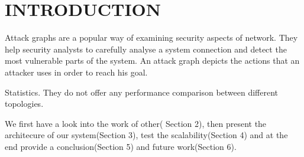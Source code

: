 \section{INTRODUCTION}

Attack graphs are a popular way of examining security aspects of network. They help security analysts to carefully analyse a system connection and detect the most vulnerable parts of the system. An attack graph depicts the actions that an attacker uses in order to reach his goal.  

 Statistics. They do not offer any performance comparison between different topologies. 

We first have a look into the work of other( Section 2), then present the architecure of our system(Section 3), test the scalability(Section 4) and at the end provide a conclusion(Section 5) and future work(Section 6).

